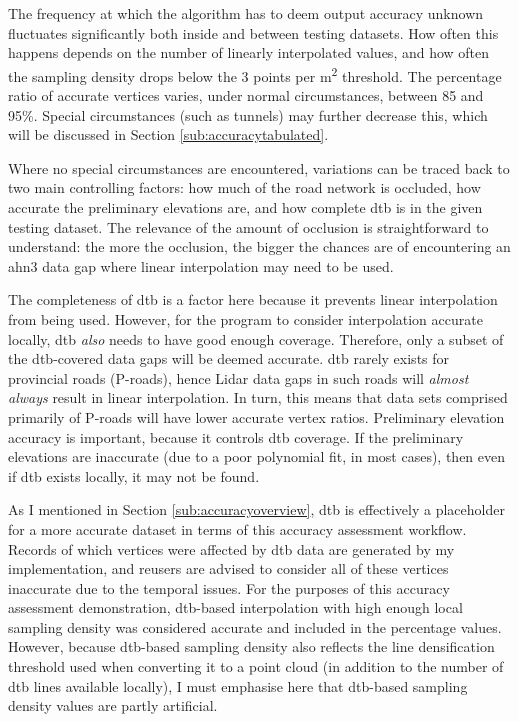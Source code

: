 The frequency at which the algorithm has to deem output accuracy unknown fluctuates significantly both inside and between testing datasets. How often this happens depends on the number of linearly interpolated values, and how often the sampling density drops below the 3 points per m\textsuperscript{2} threshold. The percentage ratio of accurate vertices varies, under normal circumstances, between 85 and 95\%. Special circumstances (such as tunnels) may further decrease this, which will be discussed in Section \ref{sub:accuracytabulated}.

Where no special circumstances are encountered, variations can be traced back to two main controlling factors: how much of the road network is occluded, how accurate the preliminary elevations are, and how complete \ac{dtb} is in the given testing dataset. The relevance of the amount of occlusion is straightforward to understand: the more the occlusion, the bigger the chances are of encountering an \ac{ahn3} data gap where linear interpolation may need to be used.

The completeness of \ac{dtb} is a factor here because it prevents linear interpolation from being used. However, for the program to consider interpolation accurate locally, \ac{dtb} \textit{also} needs to have good enough coverage. Therefore, only a subset of the \ac{dtb}-covered data gaps will be deemed accurate. \ac{dtb} rarely exists for provincial roads (P-roads), hence Lidar data gaps in such roads will \textit{almost always} result in linear interpolation. In turn, this means that data sets comprised primarily of P-roads will have lower accurate vertex ratios. Preliminary elevation accuracy is important, because it controls \ac{dtb} coverage. If the preliminary elevations are inaccurate (due to a poor polynomial fit, in most cases), then even if \ac{dtb} exists locally, it may not be found.

As I mentioned in Section \ref{sub:accuracyoverview}, \ac{dtb} is effectively a placeholder for a more accurate dataset in terms of this accuracy assessment workflow. Records of which vertices were affected by \ac{dtb} data are generated by my implementation, and reusers are advised to consider all of these vertices inaccurate due to the temporal issues. For the purposes of this accuracy assessment demonstration, \ac{dtb}-based interpolation with high enough local sampling density was considered accurate and included in the percentage values. However, because \ac{dtb}-based sampling density also reflects the line densification threshold used when converting it to a point cloud (in addition to the number of \ac{dtb} lines available locally), I must emphasise here that \ac{dtb}-based sampling density values are partly artificial.

